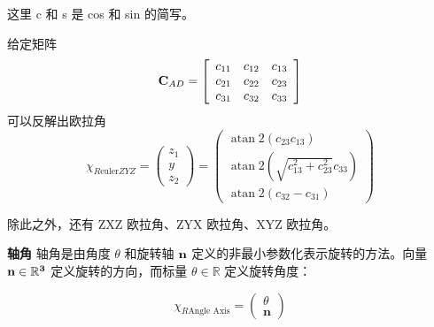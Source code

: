 \documentclass[11pt]{ctexart}
\begin{document}
这里 c 和 s 是 cos 和 sin 的简写。

给定矩阵
\begin{equation}
{\bf C}_{A D}=\left[\begin{array}{c c c}{{c_{11}}}&{{c_{12}}}&{{c_{13}}}\\ {{c_{21}}}&{{c_{22}}}&{{c_{23}}}\\ {{c_{31}}}&{{c_{32}}}&{{c_{33}}}\end{array}\right]
\end{equation}
可以反解出欧拉角
\begin{equation}
    \left.\chi_{R\text{euler}ZYZ}=\left(\begin{array}{c}z_{1}\\y\\z_{2}\end{array}\right.\right)=\left(\begin{array}{c}\operatorname{atan}2\left(c_{23}c_{13}\right)\\\operatorname{atan}2\left(\sqrt{c_{13}^2+c_{23}^2}c_{33}\right)\\\operatorname{atan}2\left(c_{32}-c_{31}\right)\end{array}\right)
\end{equation}
    
除此之外，还有 ZXZ 欧拉角、ZYX 欧拉角、XYZ 欧拉角。

\noindent\textbf{轴角}
轴角是由角度 $\theta$ 和旋转轴 $\bf{n}$ 定义的非最小参数化表示旋转的方法。向量 $\bf{n}\in\mathbb{R}^3$ 定义旋转的方向，而标量 $\theta\in\mathbb{R}$ 定义旋转角度：

\begin{equation}
    \left.\chi_{R\text{Angle Axis}}=\left(\begin{array}{c}\theta\\\mathbf{n}\end{array}\right.\right)
\end{equation}
\end{document}
